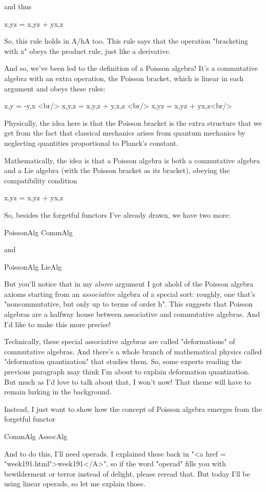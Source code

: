 and thus

{x,yz} = {x,y}z + y{x,z}

So, this rule holds in A/hA too.  This rule says that the operation
"bracketing with x" obeys the product rule, just like a
derivative.

And so, we've been led to the definition of a Poisson algebra!  It's a
commutative algebra with an extra operation, the Poisson bracket,
which is linear in each argument and obeys these rules:

{x,y} = -{y,x}  <br/>
{x,{y,z}} = {{x,y},z} + {y,{x,z}} <br/>
{x,yz} = {x,y}z + y{x,z}<br/>

Physically, the idea here is that the Poisson bracket is the extra
structure that we get from the fact that classical mechanics arises
from quantum mechanics by neglecting quantities proportional to
Planck's constant.

Mathematically, the idea is that a Poisson algebra is both a
commutative algebra and a Lie algebra (with the Poisson bracket as its
bracket), obeying the compatibility condition

{x,yz} = {x,y}z + y{x,z}

So, besides the forgetful functors I've already drawn, we have two
more:

PoissonAlg \to  CommAlg

and 

PoissonAlg \to  LieAlg

But you'll notice that in my above argument I got ahold of the Poisson
algebra axioms starting from an \emph{associative} algebra of a
special sort: roughly, one that's "noncommutative, but only up to
terms of order h".  This suggests that Poisson algebras are a
halfway house between associative and commutative algebras.  And I'd
like to make this more precise!

Technically, these special associative algebras are called
"deformations" of commutative algebras.  And there's a whole
branch of mathematical physics called "deformation
quantization" that studies them.  So, some experts reading the
previous paragraph may think I'm about to explain deformation
quantization.  But much as I'd love to talk about that, I won't now!
That theme will have to remain lurking in the background.

Instead, I just want to show how the concept of Poisson algebra
emerges from the forgetful functor

CommAlg \to  AssocAlg

And to do this, I'll need operads.  I explained these back in "<a
href = "week191.html">week191</A>", so if the word
"operad" fills you with bewilderment or terror instead of
delight, please reread that.  But today I'll be using linear operads,
so let me explain those.

